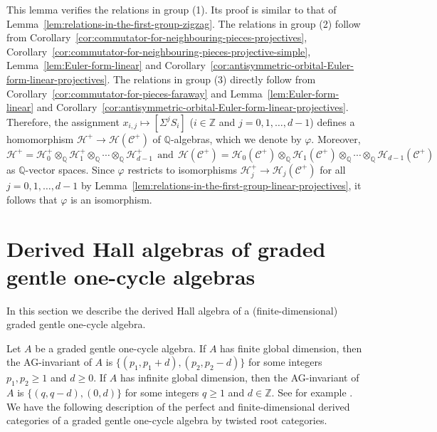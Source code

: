 \documentclass[reqno,12pt,a4paper]{amsart}
\theoremstyle{remark}
\theoremstyle{definition}
\newcommand{\cc}{{\mathcal C}}
\newcommand{\ch}{{\mathcal H}}
\numberwithin{equation}{section}
\begin{document}
This lemma verifies the relations in group (1). Its proof is similar to that of Lemma~\ref{lem:relations-in-the-first-group-zigzag}.
The relations in group (2) follow from Corollary~\ref{cor:commutator-for-neighbouring-pieces-projectives}, Corollary~\ref{cor:commutator-for-neighbouring-pieces-projective-simple}, Lemma~\ref{lem:Euler-form-linear} and Corollary~\ref{cor:antisymmetric-orbital-Euler-form-linear-projectives}. The relations in group (3) directly follow from Corollary~\ref{cor:commutator-for-pieces-faraway} and Lemma~\ref{lem:Euler-form-linear} and Corollary~\ref{cor:antisymmetric-orbital-Euler-form-linear-projectives}.  
Therefore, the assignment $x_{i,j}\mapsto [\Sigma^{j}S_i]$ ($i\in\mathbb{Z}$ and $j=0,1,\ldots,d-1$) defines a homomorphism $\ch^+\to\ch(\cc^+)$ of $\mathbb{Q}$-algebras, which we denote by $\varphi$. Moreover,
\[
\ch^+=\ch^+_0\otimes_{\mathbb{Q}}\ch^+_1\otimes_{\mathbb{Q}}\cdots\otimes_{\mathbb{Q}}\ch^+_{d-1}
~~\text{and}~~
\ch(\cc^+)=\ch_0(\cc^+)\otimes_\mathbb{Q}\ch_1(\cc^+)\otimes_\mathbb{Q}\cdots\otimes_\mathbb{Q}\ch_{d-1}(\cc^+)
\]
as $\mathbb{Q}$-vector spaces. Since $\varphi$ restricts to isomorphisms $\ch^+_j\to\ch_j(\cc^+)$ for all $j=0,1,\ldots,d-1$ by Lemma~\ref{lem:relations-in-the-first-group-linear-projectives}, it follows that $\varphi$ is an isomorphism. 


\section{Derived Hall algebras of graded gentle one-cycle algebras}
\label{s:derive-Hall-algebra-of-graded-gentle-one-cycle-algebra}

In this section we describe the derived Hall algebra of a (finite-dimensional) graded gentle one-cycle algebra.

\medskip

Let $A$ be a graded gentle one-cycle algebra. If $A$ has finite global dimension, then the AG-invariant of $A$ is  $\{(p_1,p_1+d),(p_2,p_2-d)\}$ for some integers $p_1,p_2\geq 1$ and $d\geq 0$. If $A$ has infinite global dimension, then the AG-invariant of $A$ is $\{(q,q-d),(0,d)\}$ for some integers $q\geq 1$ and $d\in\mathbb{Z}$. See for example \cite[Lemma 6.2]{ChenYang25}. We have the following description of the perfect and finite-dimensional derived categories of a graded gentle one-cycle algebra by twisted root categories.
\end{document}
